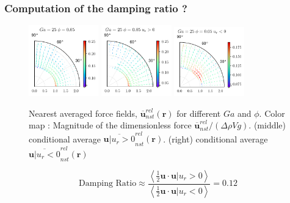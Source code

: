 \documentclass{sintefbeamer}
\newcommand{\avg}[1]{\left<#1\right>}
\newcommand{\nstrelavg}[1]{\overline{#1}_{nst}^{rel}}
\begin{document}
 
\backmatter
\begin{frame}
  \frametitle{Computation of the damping ratio ? }
  \begin{figure}
    \centering
    \includegraphics[width=0.27\textwidth]{image/HOMOGENEOUS/fDrop/U_mu_r_0_1_Ga_25_PHI_0_05.pdf}
    \includegraphics[width=0.27\textwidth]{image/HOMOGENEOUS/fDrop/Upos_mu_r_0_1_Ga_25_PHI_0_05.pdf}
    \includegraphics[width=0.27\textwidth]{image/HOMOGENEOUS/fDrop/Uneg_mu_r_0_1_Ga_25_PHI_0_05.pdf}
    \caption{Nearest averaged force fields, $\nstrelavg{\textbf{u}}(\textbf{r})$ for different $Ga$ and $\phi$. 
    Color map : Magnitude of the dimensionless force  $\nstrelavg{\textbf{u}} / (\Delta \rho V g)$.
    (middle) conditional average  $\nstrelavg{\textbf{u}| u_r > 0}(\textbf{r})$. 
    (right) conditional average  $\nstrelavg{\textbf{u}| u_r < 0}(\textbf{r})$ }
  \end{figure}
  \begin{equation}
    \text{Damping Ratio}
    \approx \frac{\avg{\frac{1}{2} \textbf{u} \cdot \textbf{u}| u_r > 0}}
    {\avg{\frac{1}{2}\textbf{u}\cdot \textbf{u}| u_r < 0}}
    = 0.12
  \end{equation}
\end{frame}
\end{document}
